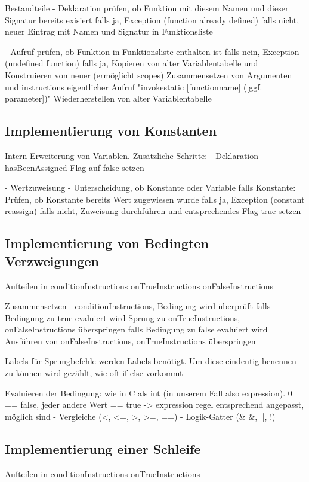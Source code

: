 \documentclass[12pt, a4paper, oneside, ngerman]{article}
\begin{document}
Bestandteile
	-	Deklaration
			prüfen, ob Funktion mit diesem Namen und dieser Signatur bereits exisiert
				falls ja, Exception (function already defined)
				falls nicht, neuer Eintrag mit Namen und Signatur in Funktionsliste

	- 	Aufruf			
			prüfen, ob Funktion in Funktionsliste enthalten ist
				falls nein, Exception (undefined function)
				falls ja, 
					Kopieren von alter Variablentabelle und Konstruieren von neuer (ermöglicht scopes)
					Zusammensetzen von Argumenten und instructions
					eigentlicher Aufruf "invokestatic [functionname] ([ggf. parameter])"
					Wiederherstellen von alter Variablentabelle

\subsection{Implementierung von Konstanten}
Intern Erweiterung von Variablen.
Zusätzliche Schritte:
	-	Deklaration
		-	hasBeenAssigned-Flag auf false setzen

	-	Wertzuweisung
		-	Unterscheidung, ob Konstante oder Variable
				falls Konstante:
					Prüfen, ob Konstante bereits Wert zugewiesen wurde
						falls ja, Exception (constant reassign)
						falls nicht, Zuweisung durchführen und entsprechendes Flag true setzen

\subsection{Implementierung von Bedingten Verzweigungen}
Aufteilen in
	conditionInstructions
	onTrueInstructions
	onFalseInstructions
	
Zusammensetzen
	-	conditionInstructions, Bedingung wird überprüft
		falls Bedingung zu true evaluiert wird
			Sprung zu onTrueInstructions, onFalseInstructions überspringen
		falls Bedingung zu false evaluiert wird
			Ausführen von onFalseInstructions, onTrueInstructions überspringen
	
Labels
	für Sprungbefehle werden Labels benötigt. Um diese eindeutig benennen zu können wird gezählt, wie oft if-else vorkommt
	


Evaluieren der Bedingung:
	wie in C als int (in unserem Fall also expression). 0 == false, jeder andere Wert == true
	 	-> expression regel entsprechend angepasst, möglich sind
	 		- Vergleiche (<, <=, >, >=, ==)
	 		- Logik-Gatter (\& \&, ||, !)


\subsection{Implementierung einer Schleife}
Aufteilen in
	conditionInstructions
	onTrueInstructions
	
\end{document}
